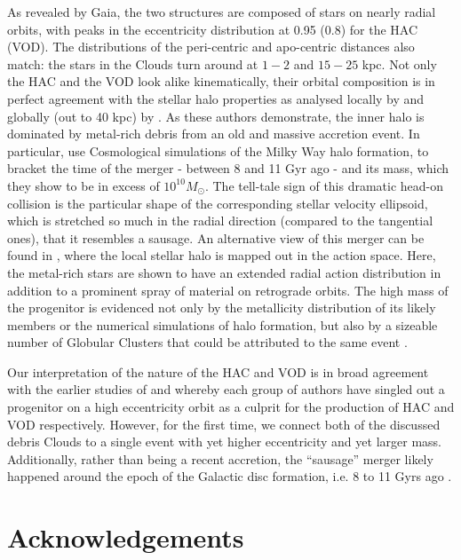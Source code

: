 \documentclass[fleqn,usenatbib]{mnras}
\begin{document}
As revealed by Gaia, the two structures are composed of stars on
nearly radial orbits, with peaks in the eccentricity distribution at
0.95 (0.8) for the HAC (VOD). The distributions of the peri-centric
and apo-centric distances also match: the stars in the Clouds turn
around at $1-2$ and $15-25$ kpc. Not only the HAC and the VOD look
alike kinematically, their orbital composition is in perfect agreement
with the stellar halo properties as analysed locally by
\citet{Belokurov2018} and globally (out to 40 kpc) by
\citet{Deason2018pileup}. As these authors demonstrate, the inner halo
is dominated by metal-rich debris from an old and massive accretion
event. In particular, \citet{Belokurov2018} use Cosmological
simulations of the Milky Way halo formation, to bracket the time of
the merger - between 8 and 11 Gyr ago - and its mass, which they show
to be in excess of $10^{10} M_{\odot}$. The tell-tale sign of this
dramatic head-on collision is the particular shape of the
corresponding stellar velocity ellipsoid, which is stretched so much
in the radial direction (compared to the tangential ones), that it
resembles a sausage. An alternative view of this merger can be found
in \citet{actionhalo}, where the local stellar halo is mapped out in
the action space. Here, the metal-rich stars are shown to have an
extended radial action distribution in addition to a prominent spray
of material on retrograde orbits. The high mass of the progenitor is
evidenced not only by the metallicity distribution of its likely
members or the numerical simulations of halo formation, but also by a
sizeable number of Globular Clusters that could be attributed to the
same event \citep[see][]{sausagegc,Kruijssen2018}.

Our interpretation of the nature of the HAC and VOD is in broad
agreement with the earlier studies of \citet{Jo2012} and \citet{Ca12}
whereby each group of authors have singled out a progenitor on a high
eccentricity orbit as a culprit for the production of HAC and VOD
respectively. However, for the first time, we connect both of the
discussed debris Clouds to a single event with yet higher eccentricity
and yet larger mass. Additionally, rather than being a recent
accretion, the ``sausage'' merger likely happened around the epoch of
the Galactic disc formation, i.e. 8 to 11 Gyrs ago
\citep[see][]{Belokurov2018}.

\section*{Acknowledgements}
\end{document}

